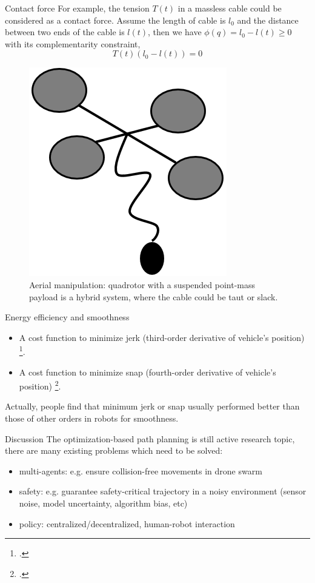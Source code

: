 \documentclass{beamer}
\begin{document}
\begin{frame}{Contact force}
	For example, the tension $T(t)$ in a massless cable could be considered as a contact force. Assume the length of cable is $l_0$ and the distance between two ends of the cable is $l(t)$, then we have $\phi(q) = l_0 - l(t) \geq 0$ with its complementarity constraint,
	\begin{equation*}
	T(t) (l_0 - l(t)) = 0
	\end{equation*}
	\begin{figure}
		\includegraphics[width=0.2\linewidth]{figures/aerial-manipulation.png}
		\caption{Aerial manipulation: quadrotor with a suspended point-mass payload is a hybrid system, where the cable could be taut or slack.}
	\end{figure}
\end{frame}

\begin{frame}{Energy efficiency and smoothness}
	\begin{itemize}
		\item A cost function to minimize jerk (third-order derivative of vehicle's position) \footcite{pattacini2010experimental}.
		\item A cost function to minimize snap (fourth-order derivative of vehicle's position) \footcite{mellinger2011minimum}.
	\end{itemize}

	Actually, people find that minimum jerk or snap usually performed better than those of other orders in robots for smoothness. 
\end{frame}

\begin{frame}{Discussion}
	The optimization-based path planning is still active research topic, there are many existing problems which need to be solved:
	\begin{itemize}
		\item multi-agents: e.g. ensure collision-free movements in drone swarm
		\item safety: e.g. guarantee safety-critical trajectory in a noisy environment (sensor noise, model uncertainty, algorithm bias, etc)
		\item policy: centralized/decentralized, human-robot interaction
	\end{itemize}
	
\end{frame}
\end{document}
